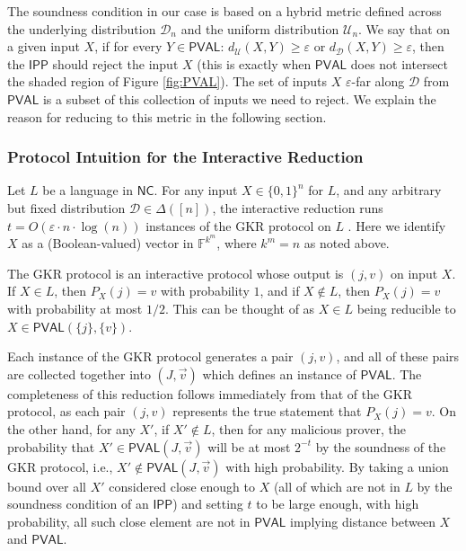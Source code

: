 \documentclass[10pt,a4paper]{article}
\newcommand{\NC}{\mathsf{NC}}
\newcommand{\PVAL}{\mathsf{PVAL}}
\newcommand{\IPP}{\mathsf{IPP}}
\newcommand{\F}{\mathbb{F}}
\newcommand{\sU}{\mathcal{U}}
\newcommand{\sD}{\mathcal{D}}
\begin{document}
The soundness condition in our case is based on a hybrid metric defined across the underlying distribution $\sD_n$ and the uniform distribution $\sU_n$. We say that on a given input $X$, if for every $Y\in \PVAL$: $d_{\sU}(X,Y)\geq \varepsilon$ or $d_{\sD}(X,Y)\geq \varepsilon$, then the $\IPP$ should reject the input $X$ (this is exactly when $\PVAL$ does not intersect the shaded region of Figure \ref{fig:PVAL}). The set of inputs $X$ $\varepsilon$-far along $\sD$ from $\PVAL$ is a subset of this collection of inputs we need to reject. We explain the reason for reducing to this metric in the following section. 

\subsubsection{Protocol Intuition for the Interactive Reduction}
\label{sec:intuition_reduction_hybrid}

Let $L$ be a language in $\NC$. For any input $X \in \{0,1\}^n$ for $L$, and any arbitrary but fixed distribution $\mathcal{D}\in \Delta([n])$, the interactive reduction runs $t=O(\varepsilon \cdot n \cdot \log (n))$ instances of the GKR protocol on $L$ \cite{GKR15}. Here we identify $X$ as a (Boolean-valued) vector in $\F^{k^{m}}$, where $k^m = n$ as noted above.

The GKR protocol is an interactive protocol whose output is $(j,v)$ on input $X$. If $X\in L$, then $P_X(j)=v$ with probability $1$, and if $X\not\in L$, then $P_X(j) = v$ with probability at most $1/2$. This can be thought of as $X\in L$ being reducible to $X\in \PVAL(\{j\}, \{v\})$.

Each instance of the GKR protocol generates a pair $(j,v)$, and all of these pairs are collected together into $(J,\vec{v})$ which defines an instance of $\PVAL$. The completeness of this reduction follows immediately from that of the GKR protocol, as each pair $(j,v)$ represents the true statement that $P_X(j)=v$. On the other hand, for any $X'$, if $X'\not\in L$, then for any malicious prover, the probability that $X'\in \PVAL(J,\vec{v})$ will be at most $2^{-t}$ by the soundness of the GKR protocol, i.e., $X' \notin \PVAL(J,\vec{v})$ with high probability. By taking a union bound over all $X'$ considered close enough to $X$ (all of which are not in $L$ by the soundness condition of an $\IPP$) and setting $t$ to be large enough, with high probability, all such close element are not in $\PVAL$ implying distance between $X$ and $\PVAL$.
\end{document}
